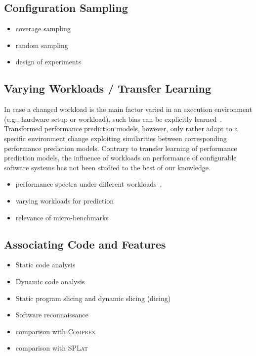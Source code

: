 \subsection{Configuration Sampling}
\begin{itemize}
	\item coverage sampling
	\item random sampling
	\item design of experiments
\end{itemize}

\subsection{Varying Workloads / Transfer Learning}
In case a changed workload is the main factor varied in an execution environment (e.g., hardware setup or workload), such bias can be explicitly learned~\cite{jamishidi_transfer_2017,jamshidi_learning_2018,jamshidi_transfer_gp_2017,ding_bayesian_2020}. Transformed performance prediction models, however, only rather adapt to a specific environment change exploiting similarities between corresponding performance prediction models. Contrary to transfer learning of performance prediction models, the influence of workloads on performance of configurable software systems has not been studied to the best of our knowledge.

\begin{itemize}
	\item performance spectra under different workloads~\cite{alves_sampling_2020}, 
	\item varying workloads for prediction~\cite{liao_2020_using_emse}
	\item relevance of micro-benchmarks \cite{laaber_emse_2021,grambow_peerj_2021}
\end{itemize}

\subsection{Associating Code and Features}
\begin{itemize}
	\item Static code analysis\cite{velez_2020_configcrusher_jase,lillack_2018_lotrack_tse,luo_2019_cova}
	\item Dynamic code analysis \cite{bell_phosphor_2014,velez_comprex_2021}
	\item Static program slicing and dynamic slicing (dicing)
	\item Software reconnaissance ~\cite{wong_integrated_2005,wilde_early_1996,agrawal_fault_1995,simmons_industrial_2006,chen_dynamic_nodate,sherwood_reducing_nodate}
\end{itemize}
\begin{itemize}
	\item comparison with \textsc{Comprex}~\cite{velez_comprex_2021}
	\item comparison with \textsc{SPLat}
\end{itemize}


